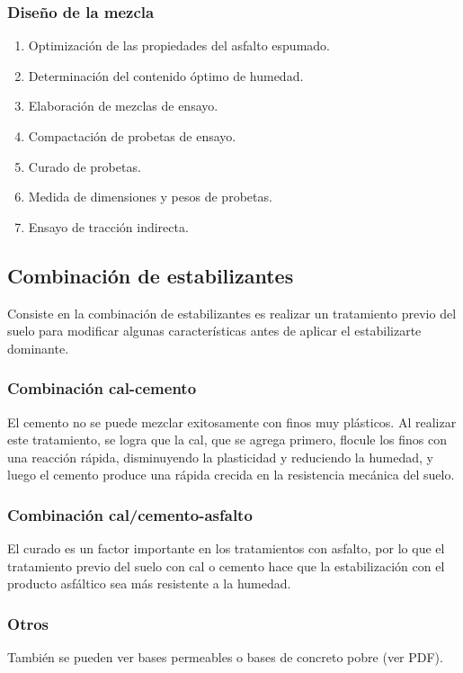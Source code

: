 \documentclass[../main.tex]{subfiles}
\begin{document}
\subsubsection{Diseño de la mezcla}

\begin{enumerate}
  \item Optimización de las propiedades del asfalto espumado.
  \item Determinación del contenido óptimo de humedad.
  \item Elaboración de mezclas de ensayo.
  \item Compactación de probetas de ensayo.
  \item Curado de probetas.
  \item Medida de dimensiones y pesos de probetas.
  \item Ensayo de tracción indirecta.

\end{enumerate}

\subsection{Combinación de estabilizantes}

Consiste en la combinación de estabilizantes es realizar un tratamiento previo
del suelo para modificar algunas características antes de aplicar el 
estabilizarte dominante.

\subsubsection{Combinación cal-cemento}

El cemento no se puede mezclar exitosamente con finos muy plásticos. Al realizar
este tratamiento, se logra que la cal, que se agrega primero, flocule los finos
con una reacción rápida, disminuyendo la plasticidad y reduciendo la humedad, 
y luego el cemento produce una rápida crecida en la resistencia mecánica del 
suelo.

\subsubsection{Combinación cal/cemento-asfalto}

El curado es un factor importante en los tratamientos con asfalto, por lo que
el tratamiento previo del suelo con cal o cemento hace que la estabilización
con el producto asfáltico sea más resistente a la humedad.

\subsubsection{Otros}

También se pueden ver bases permeables o bases de concreto pobre (ver PDF).
\end{document}
